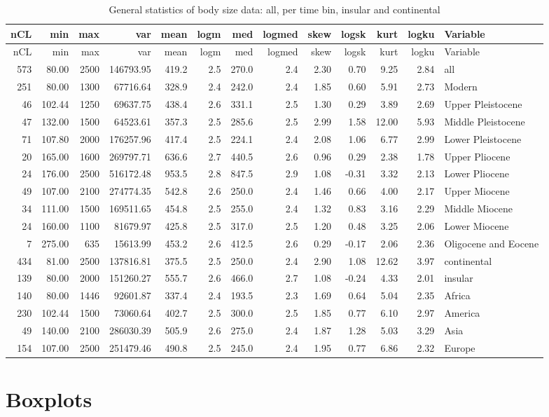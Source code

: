 \documentclass[]{article}
\begin{document}
\begin{longtable}[]{@{}rrrrrrrrrrrrl@{}}
\caption{General statistics of body size data: all, per time bin,
insular and continental}\tabularnewline
\toprule
nCL & min & max & var & mean & logm & med & logmed & skew & logsk & kurt
& logku & Variable\tabularnewline
\midrule
\endfirsthead
\toprule
nCL & min & max & var & mean & logm & med & logmed & skew & logsk & kurt
& logku & Variable\tabularnewline
\midrule
\endhead
573 & 80.00 & 2500 & 146793.95 & 419.2 & 2.5 & 270.0 & 2.4 & 2.30 & 0.70
& 9.25 & 2.84 & all\tabularnewline
251 & 80.00 & 1300 & 67716.64 & 328.9 & 2.4 & 242.0 & 2.4 & 1.85 & 0.60
& 5.91 & 2.73 & Modern\tabularnewline
46 & 102.44 & 1250 & 69637.75 & 438.4 & 2.6 & 331.1 & 2.5 & 1.30 & 0.29
& 3.89 & 2.69 & Upper Pleistocene\tabularnewline
47 & 132.00 & 1500 & 64523.61 & 357.3 & 2.5 & 285.6 & 2.5 & 2.99 & 1.58
& 12.00 & 5.93 & Middle Pleistocene\tabularnewline
71 & 107.80 & 2000 & 176257.96 & 417.4 & 2.5 & 224.1 & 2.4 & 2.08 & 1.06
& 6.77 & 2.99 & Lower Pleistocene\tabularnewline
20 & 165.00 & 1600 & 269797.71 & 636.6 & 2.7 & 440.5 & 2.6 & 0.96 & 0.29
& 2.38 & 1.78 & Upper Pliocene\tabularnewline
24 & 176.00 & 2500 & 516172.48 & 953.5 & 2.8 & 847.5 & 2.9 & 1.08 &
-0.31 & 3.32 & 2.13 & Lower Pliocene\tabularnewline
49 & 107.00 & 2100 & 274774.35 & 542.8 & 2.6 & 250.0 & 2.4 & 1.46 & 0.66
& 4.00 & 2.17 & Upper Miocene\tabularnewline
34 & 111.00 & 1500 & 169511.65 & 454.8 & 2.5 & 255.0 & 2.4 & 1.32 & 0.83
& 3.16 & 2.29 & Middle Miocene\tabularnewline
24 & 160.00 & 1100 & 81679.97 & 425.8 & 2.5 & 317.0 & 2.5 & 1.20 & 0.48
& 3.25 & 2.06 & Lower Miocene\tabularnewline
7 & 275.00 & 635 & 15613.99 & 453.2 & 2.6 & 412.5 & 2.6 & 0.29 & -0.17 &
2.06 & 2.36 & Oligocene and Eocene\tabularnewline
434 & 81.00 & 2500 & 137816.81 & 375.5 & 2.5 & 250.0 & 2.4 & 2.90 & 1.08
& 12.62 & 3.97 & continental\tabularnewline
139 & 80.00 & 2000 & 151260.27 & 555.7 & 2.6 & 466.0 & 2.7 & 1.08 &
-0.24 & 4.33 & 2.01 & insular\tabularnewline
140 & 80.00 & 1446 & 92601.87 & 337.4 & 2.4 & 193.5 & 2.3 & 1.69 & 0.64
& 5.04 & 2.35 & Africa\tabularnewline
230 & 102.44 & 1500 & 73060.64 & 402.7 & 2.5 & 300.0 & 2.5 & 1.85 & 0.77
& 6.10 & 2.97 & America\tabularnewline
49 & 140.00 & 2100 & 286030.39 & 505.9 & 2.6 & 275.0 & 2.4 & 1.87 & 1.28
& 5.03 & 3.29 & Asia\tabularnewline
154 & 107.00 & 2500 & 251479.46 & 490.8 & 2.5 & 245.0 & 2.4 & 1.95 &
0.77 & 6.86 & 2.32 & Europe\tabularnewline
\bottomrule
\end{longtable}

\newpage

\section{Boxplots}\label{boxplots}
\end{document}
